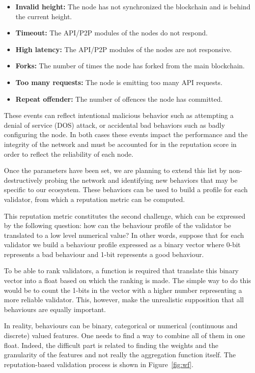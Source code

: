 \begin{itemize}
    \item \textbf{Invalid height:} The node has not synchronized the blockchain and is behind the current height.
    \item \textbf{Timeout:} The API/P2P modules of the nodes do not respond.
    \item \textbf{High latency:} The API/P2P modules of the nodes are not responsive.
    \item \textbf{Forks:} The number of times the node has forked from the main blockchain.
    \item \textbf{Too many requests:} The node is emitting too many API requests.
    \item \textbf{Repeat offender:} The number of offences the node has committed.
\end{itemize}

These events can reflect intentional malicious behavior such as attempting a denial of service (DOS) attack, or accidental bad behaviors such as badly configuring the node. In both cases these events impact the performance and the integrity of the network and must be accounted for in the reputation score in order to reflect the reliability of each node.

Once the parameters have been set, we are planning to extend this list by non-destructively probing the network and identifying new behaviors that may be specific to our ecosystem. These behaviors can be used to build a profile for each validator, from which a reputation metric can be computed.

This reputation metric constitutes the second challenge, which can be expressed by the following question: how can the behaviour profile of the validator be translated to a low level numerical value? In other words, suppose that for each validator we build a behaviour profile expressed as a binary vector where 0-bit represents a bad behaviour and 1-bit represents a good behaviour.

To be able to rank validators, a function is required that translate this binary vector into a float based on which the ranking is made. The simple way to do this would be to count the 1-bits in the vector with a higher number representing a more reliable validator. This, however, make the unrealistic supposition that all behaviours are equally important.

In reality, behaviours can be binary, categorical or numerical (continuous and discrete) valued features. One needs to find a way to combine all of them in one float. Indeed, the difficult part is related to finding the weights and the granularity of the features and not really the aggregation function itself. The reputation-based validation process is shown in Figure~\ref{fig:wf}.

